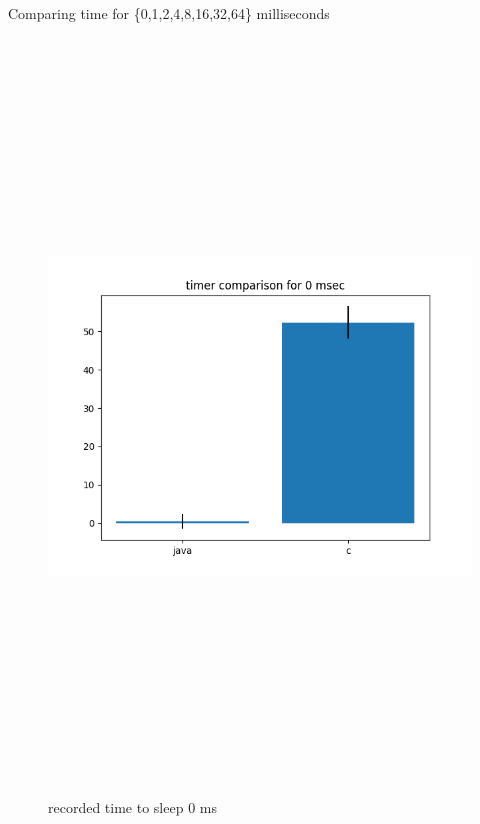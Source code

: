 \documentclass{article}
\begin{document}
    Comparing time for \{0,1,2,4,8,16,32,64\} milliseconds
    \begin{figure}[H]
    	\centering
    	\includegraphics[width=17cm,height=20cm,keepaspectratio]{AsyncMonitorCompares/sleep-timer_java-vs-c/time-compare-0.png}
    	\caption{recorded time to sleep 0 ms}
    	\label{fig:xalan-fix-PKG}
    \end{figure}
\end{document}
